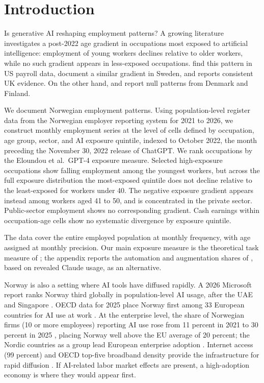 \section{Introduction}
\label{sec:introduction}

Is generative AI reshaping employment patterns? A growing literature investigates a post-2022 age gradient in occupations most exposed to artificial intelligence: employment of young workers declines relative to older workers, while no such gradient appears in less-exposed occupations. \cite{brynjolfsson2025} find this pattern in US payroll data, \cite{lodefalk2026} document a similar gradient in Sweden, and \cite{teeselink2025} reports consistent UK evidence. On the other hand, \cite{humlum2026} and \cite{kauhanen2026} report null patterns from Denmark and Finland.

We document Norwegian employment patterns. Using population-level register data from the Norwegian employer reporting system for 2021 to 2026, we construct monthly employment series at the level of cells defined by occupation, age group, sector, and AI exposure quintile, indexed to October 2022, the month preceding the November 30, 2022 release of ChatGPT. We rank occupations by the Eloundou et al.\ GPT-4 exposure measure. Selected high-exposure occupations show falling employment among the youngest workers, but across the full exposure distribution the most-exposed quintile does not decline relative to the least-exposed for workers under 40. The negative exposure gradient appears instead among workers aged 41 to 50, and is concentrated in the private sector. Public-sector employment shows no corresponding gradient. Cash earnings within occupation-age cells show no systematic divergence by exposure quintile.

The data cover the entire employed population at monthly frequency, with age assigned at monthly precision. Our main exposure measure is the theoretical task measure of \citet{eloundou2024}; the appendix reports the automation and augmentation shares of \citet{handa2025}, based on revealed Claude usage, as an alternative.

Norway is also a setting where AI tools have diffused rapidly. A 2026 Microsoft report ranks Norway third globally in population-level AI usage, after the UAE and Singapore \citep{microsoft2026ai}. OECD data for 2025 place Norway first among 33 European countries for AI use at work \citep{oecd2026ai}. At the enterprise level, the share of Norwegian firms (10 or more employees) reporting AI use rose from 11 percent in 2021 to 30 percent in 2025 \citep{ssb2025ikt}, placing Norway well above the EU average of 20 percent; the Nordic countries as a group lead European enterprise adoption \citep{bick2026}. Internet access (99 percent) and OECD top-five broadband density provide the infrastructure for rapid diffusion \citep{oecd2024digitalnorway}. If AI-related labor market effects are present, a high-adoption economy is where they would appear first.
